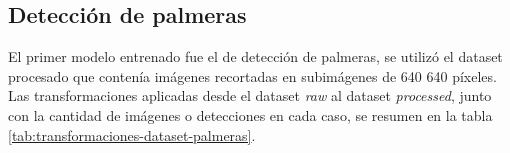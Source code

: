 \subsection{Detección de palmeras}
\label{sec:deteccionPalmeras}


El primer modelo entrenado fue el de detección de palmeras, se utilizó el dataset procesado que contenía imágenes recortadas en subimágenes de \SI{640}{}\,\texttimes\,\SI{640}{} píxeles. Las transformaciones aplicadas desde el dataset \textit{raw} al dataset \textit{processed}, junto con la cantidad de imágenes o detecciones en cada caso, se resumen en la tabla \ref{tab:transformaciones-dataset-palmeras}.

